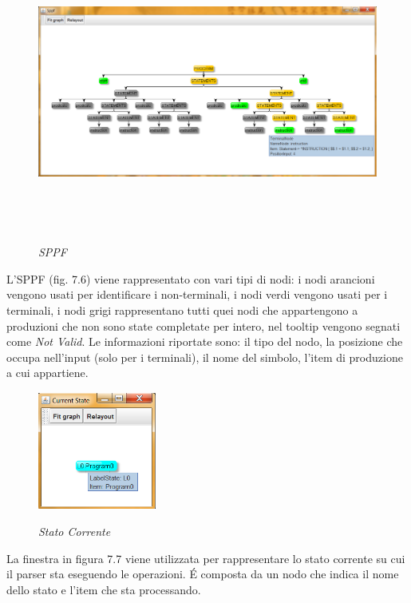 \begin{figure}[hbpb]\label{SPPF}
	{\includegraphics[height=260pt,width=420pt,scale=0.1]{files/SPPF.png}}
	\caption{\textit{SPPF}}
\end{figure}
\noindent L'SPPF (fig. 7.6) viene rappresentato con vari tipi di nodi: i nodi arancioni vengono usati per identificare i non-terminali, i nodi verdi vengono usati per i terminali, i nodi grigi rappresentano tutti quei nodi che appartengono a produzioni che non sono state completate per intero, nel tooltip vengono segnati come \textit{Not Valid}. Le informazioni riportate sono: il tipo del nodo, la posizione che occupa nell'input (solo per i terminali), il nome del simbolo, l'item di produzione a cui appartiene.\par 
\begin{figure}[hbpb]\label{currentState}
	\centering
	{\includegraphics[height=110pt,width=110pt,scale=0.1]{files/CurrentState.png}}
	\caption{\textit{Stato Corrente}}
\end{figure}
\noindent La finestra in figura 7.7 viene utilizzata per rappresentare lo stato corrente su cui il parser sta eseguendo le operazioni. \'E composta da un nodo che indica il nome dello stato e l'item che sta processando.\par
